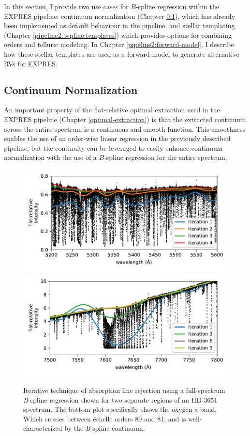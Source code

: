 In this section, I provide two use cases for $B$-spline regression within the EXPRES pipeline: continuum normalization (Chapter \ref{pipeline2:bspline:cont-norm}), which has already been implemented as default behaviour in the pipeline, and stellar templating (Chapter \ref{pipeline2:bspline:templates}) which provides options for combining orders and telluric modeling. In Chapter \ref{pipeline2:forward-model}, I describe how these stellar templates are used as a forward model to generate alternative RVs for EXPRES.

\subsection{Continuum Normalization} \label{pipeline2:bspline:cont-norm}

An important property of the flat-relative optimal extraction used in the EXPRES pipeline (Chapter \ref{optimal-extraction}) is that the extracted continuum across the entire spectrum is a continuous and smooth function. This smoothness enables the use of an order-wise linear regression in the previously described pipeline, but the continuity can be leveraged to easily enhance continuum normalization with the use of a $B$-spline regression for the entire spectrum.

\begin{figure}
    \centering
    \includegraphics[width=\textwidth]{figures-5/cont-norm-bspline.pdf}
    \includegraphics[width=\textwidth]{figures-5/cont-norm-bspline-oxygen.pdf}
    \caption[Continuum normalization iterative absorption line rejection]{Iterative technique of absorption line rejection using a full-spectrum \textit{B}-spline regression shown for two separate regions of an HD 3651 spectrum. The bottom plot specifically shows the oxygen a-band, Which crosses between \'echelle orders 80 and 81, and is well-characterized by the \textit{B}-spline continuum.}
    \label{fig:cont-norm-bspline}
\end{figure}

